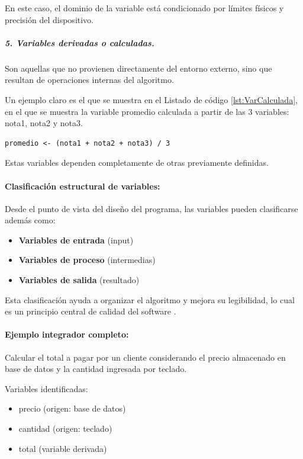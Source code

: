 \documentclass[12pt,twoside]{book}
\begin{document}
					\noindent
					En este caso, el dominio de la variable está condicionado por límites físicos y precisión del dispositivo.
					
					\subparagraph{5. Variables derivadas o calculadas.} Son aquellas que no provienen directamente del entorno externo, sino que resultan de operaciones internas del algoritmo.
					
					Un ejemplo claro es el que se muestra en el Listado de código \ref{lst:VarCalculada}, en el que se muestra la variable promedio calculada a partir de las 3 variables: nota1, nota2 y nota3.
					
					\begin{lstlisting}[style=upsamStyle,caption={Variable Calculada.}, label={lst:VarCalculada},basicstyle=\small\ttfamily]
	promedio <- (nota1 + nota2 + nota3) / 3 \end{lstlisting}
					
					\noindent
					Estas variables dependen completamente de otras previamente definidas.
					
					\paragraph{Clasificación estructural de variables:} Desde el punto de vista del diseño del programa, las variables pueden clasificarse además como:
					
					\begin{itemize}
						\item \textbf{Variables de entrada} (input)
						\item \textbf{Variables de proceso} (intermedias)
						\item \textbf{Variables de salida} (resultado)
					\end{itemize}
					
					\noindent
					Esta clasificación ayuda a organizar el algoritmo y mejora su legibilidad, lo cual es un principio central de calidad del software \cite{Martin2008Clean}.
					
					\paragraph{Ejemplo integrador completo:} Calcular el total a pagar por un cliente considerando el precio almacenado en base de datos y la cantidad ingresada por teclado.
						
						Variables identificadas:
						
						\begin{itemize}
							\item precio (origen: base de datos)
							\item cantidad (origen: teclado)
							\item total (variable derivada)
						\end{itemize}
						
\end{document}
